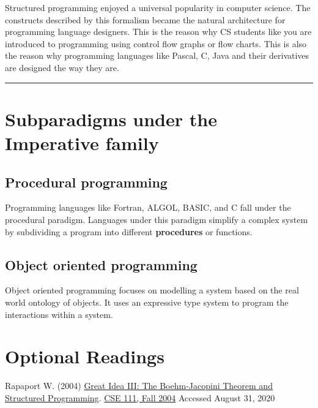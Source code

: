 Structured programming enjoyed a universal popularity in computer
science. The constructs described by this formalism became the natural
architecture for programming language designers. This is the reason why
CS students like you are introduced to programming using control flow
graphs or flow charts. This is also the reason why programming languages
like Pascal, C, Java and their derivatives are designed the way they
are.

\begin{center}\rule{0.5\linewidth}{0.5pt}\end{center}

\section{Subparadigms under the Imperative
family}\label{imperative-programming.md__subparadigms-under-the-imperative-family}

\subsection{Procedural
programming}\label{imperative-programming.md__procedural-programming}

Programming languages like Fortran, ALGOL, BASIC, and C fall under the
procedural paradigm. Languages under this paradigm simplify a complex
system by subdividing a program into different \textbf{procedures} or
functions.

\subsection{Object oriented
programming}\label{imperative-programming.md__object-oriented-programming}

Object oriented programming focuses on modelling a system based on the
real world ontology of objects. It uses an expressive type system to
program the interactions within a system.

\section{Optional
Readings}\label{imperative-programming.md__optional-readings}

Rapaport W. (2004)
\href{https://cse.buffalo.edu/~rapaport/111F04/greatidea3.html}{Great
Idea III: The Boehm-Jacopini Theorem and Structured Programming}.
\href{http://www.cse.buffalo.edu/~rapaport/111F04.html}{CSE 111, Fall
2004} Accessed August 31, 2020

